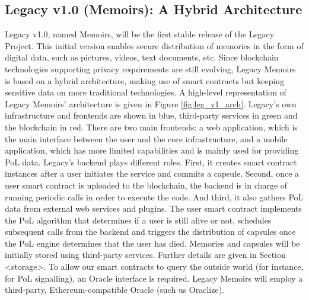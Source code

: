 \subsection{Legacy v1.0 (Memoirs): A Hybrid Architecture} %
\label{sub:legacy_v1_0_memoirs_a_hybrid_architecture}
Legacy v1.0, named Memoirs, will be the first stable release of the Legacy Project. This initial version enables secure distribution of memories in the form of digital data, such as pictures, videos, text documents, etc. Since blockchain technologies supporting privacy requirements are still evolving, Legacy Memoirs is based on a hybrid architecture, making use of smart contracts but keeping sensitive data on more traditional technologies.
A high-level representation of Legacy Memoirs’ architecture is given in Figure \ref{fig:leg_v1_arch}. Legacy’s own infrastructure and frontends are shown in blue, third-party services in green and the blockchain in red. There are two main frontends: a web application, which is the main interface between the user and the core infrastructure, and a mobile application, which has more limited capabilities and is mainly used for providing PoL data. Legacy’s backend plays different roles. First, it creates smart contract instances after a user initiates the service and commits a capsule. Second, once a user smart contract is uploaded to the blockchain, the backend is in charge of running periodic calls in order to execute the code. And third, it also gathers PoL data from external web services and plugins. The user smart contract implements the PoL algorithm that determines if a user is still alive or not, schedules subsequent calls from the backend and triggers the distribution of capsules once the PoL engine determines that the user has died. 
Memories and capsules will be initially stored using third-party services. Further details are given in Section <storage>.
To allow our smart contracts to query the outside world (for instance, for PoL signalling), an Oracle interface is required. Legacy Memoirs will employ a third-party, Ethereum-compatible Oracle (such us Oraclize).

